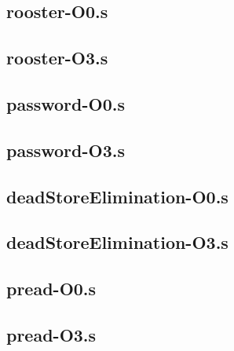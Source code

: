 \begin{appendices}
\subsection{rooster-O0.s}

\subsection{rooster-O3.s}


\subsection{password-O0.s}

\subsection{password-O3.s}


\subsection{deadStoreElimination-O0.s}

\subsection{deadStoreElimination-O3.s}


\subsection{pread-O0.s}

\subsection{pread-O3.s}


\end{appendices}